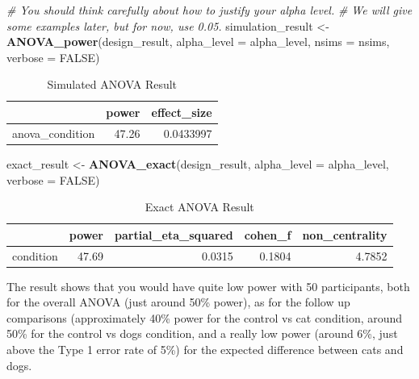 \documentclass[]{book}
\newenvironment{Shaded}{\begin{snugshade}}{\end{snugshade}}
\newcommand{\CommentTok}[1]{\textcolor[rgb]{0.56,0.35,0.01}{\textit{#1}}}
\newcommand{\DataTypeTok}[1]{\textcolor[rgb]{0.13,0.29,0.53}{#1}}
\newcommand{\KeywordTok}[1]{\textcolor[rgb]{0.13,0.29,0.53}{\textbf{#1}}}
\newcommand{\NormalTok}[1]{#1}
\newcommand{\OtherTok}[1]{\textcolor[rgb]{0.56,0.35,0.01}{#1}}
\newcommand{\StringTok}[1]{\textcolor[rgb]{0.31,0.60,0.02}{#1}}
\begin{document}
\begin{Shaded}
\begin{Highlighting}[]
\CommentTok{# You should think carefully about how to justify your alpha level.}
\CommentTok{# We will give some examples later, but for now, use 0.05.}
\NormalTok{simulation_result <-}\StringTok{ }\KeywordTok{ANOVA_power}\NormalTok{(design_result, }
                                 \DataTypeTok{alpha_level =}\NormalTok{ alpha_level, }
                                 \DataTypeTok{nsims =}\NormalTok{ nsims,}
                                 \DataTypeTok{verbose =} \OtherTok{FALSE}\NormalTok{)}
\end{Highlighting}
\end{Shaded}

\begin{table}[!h]

\caption{\label{tab:unnamed-chunk-32}Simulated ANOVA Result}
\centering
\begin{tabular}{l|r|r}
\hline
  & power & effect\_size\\
\hline
anova\_condition & 47.26 & 0.0433997\\
\hline
\end{tabular}
\end{table}

\begin{Shaded}
\begin{Highlighting}[]
\NormalTok{exact_result <-}\StringTok{ }\KeywordTok{ANOVA_exact}\NormalTok{(design_result,}
                            \DataTypeTok{alpha_level =}\NormalTok{ alpha_level,}
                            \DataTypeTok{verbose =} \OtherTok{FALSE}\NormalTok{)}
\end{Highlighting}
\end{Shaded}

\begin{table}[!h]

\caption{\label{tab:unnamed-chunk-34}Exact ANOVA Result}
\centering
\begin{tabular}{l|r|r|r|r}
\hline
  & power & partial\_eta\_squared & cohen\_f & non\_centrality\\
\hline
condition & 47.69 & 0.0315 & 0.1804 & 4.7852\\
\hline
\end{tabular}
\end{table}

The result shows that you would have quite low power with 50 participants, both for the overall ANOVA (just around 50\% power), as for the follow up comparisons (approximately 40\% power for the control vs cat condition, around 50\% for the control vs dogs condition, and a really low power (around 6\%, just above the Type 1 error rate of 5\%) for the expected difference between cats and dogs.
\end{document}

